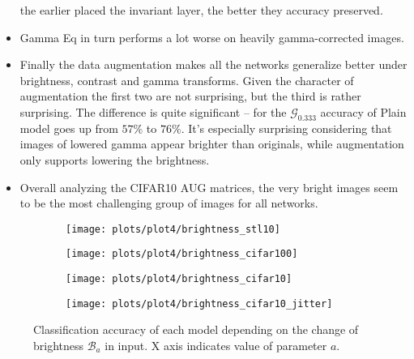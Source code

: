 \begin{itemize}
        the earlier placed the invariant layer, the better they accuracy
        preserved.
    \item Gamma Eq in turn performs a lot worse on heavily gamma-corrected
        images.
    \item Finally the data augmentation makes all the networks generalize better
        under brightness, contrast and gamma transforms. Given the character of
        augmentation the first two are not surprising, but the third is rather
        surprising. The difference is quite significant -- for the
        $\mathcal{G}_0.333$ accuracy of Plain model goes up from $57\%$ to
        $76\%$. It's especially surprising considering that images of lowered
        gamma appear brighter than originals, while augmentation only supports
        lowering the brightness.
    \item Overall analyzing the CIFAR10 AUG matrices, the very bright images
        seem to be the most challenging group of images for all networks.
    \end{itemize}



    \begin{figure}[h!]
    \begin{adjustwidth}{-11em}{-11em}
        \centering
        \begin{subfigure}{0.6\textwidth}
            \texttt{[image: plots/plot4/brightness\_stl10]}
        \end{subfigure}
        \begin{subfigure}{0.6\textwidth}
            \texttt{[image: plots/plot4/brightness\_cifar100]}
        \end{subfigure}
        \begin{subfigure}{0.6\textwidth}
            \texttt{[image: plots/plot4/brightness\_cifar10]}
        \end{subfigure}
        \begin{subfigure}{0.6\textwidth}
            \texttt{[image: plots/plot4/brightness\_cifar10\_jitter]}
        \end{subfigure}
    \end{adjustwidth}
        \caption{Classification accuracy of each model depending on the change
        of brightness $\mathcal{B}_a$ in input. X axis indicates value of
        parameter $a$.}
        \label{fig:plot4brightness}
    \end{figure}


